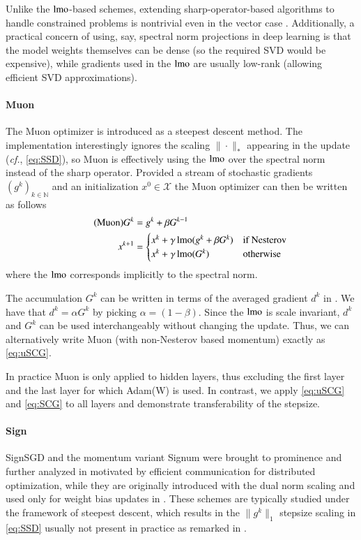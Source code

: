 Unlike the $\operatorname{lmo}$-based schemes, extending sharp-operator-based algorithms to handle constrained problems is nontrivial even in the vector case \citep{el2018learning}. 
Additionally, a practical concern of using, say, spectral norm projections in deep learning is that the model weights themselves can be dense (so the required SVD would be expensive), while gradients used in the $\operatorname{lmo}$ are usually low-rank (allowing efficient SVD approximations).

\paragraph{Muon} The Muon optimizer \citep{jordan2024muon} is introduced as a steepest descent method. 
The implementation interestingly ignores the scaling $\|\cdot\|_*$ appearing in the update (\textit{cf.}, \eqref{eq:SSD}), so Muon is effectively using the $\operatorname{lmo}$ over the spectral norm instead of the sharp operator.
Provided a stream of stochastic gradients $(g^k)_{k\in \mathbb N}$ and an initialization $x^0\in\mathcal X$ the Muon optimizer can then be written as follows
\begin{align*}\label{eq:Muon}
\tag{Muon}
G^k &= g^k + \beta G^{k-1} \\
x^{k+1} &= \begin{cases}
x^{k} + \gamma \operatorname{lmo}(g^k + \beta G^k) & \text{if Nesterov} \\
x^{k} + \gamma \operatorname{lmo}(G^k) & \text{otherwise}
\end{cases}
\end{align*}
where the $\operatorname{lmo}$ corresponds implicitly to the spectral norm.

The accumulation $G^k$ can be written in terms of the averaged gradient $d^k$ in .
We have that $d^k = \alpha G^k$ by picking $\alpha = (1-\beta)$.
Since the $\operatorname{lmo}$ is scale invariant, $d^k$ and $G^k$ can be used interchangeably without changing the update.
Thus, we can alternatively write Muon (with non-Nesterov based momentum) exactly as \ref{eq:uSCG}.

In practice Muon is only applied to hidden layers, thus excluding the first layer and the last layer for which Adam(W) is used.
In contrast, we apply \ref{eq:uSCG} and \ref{eq:SCG} to all layers and demonstrate transferability of the stepsize.

\paragraph{Sign}
SignSGD and the momentum variant Signum were brought to prominence and further analyzed in \citet{bernstein2018signsgd} motivated by efficient communication for distributed optimization, while they are originally introduced with the dual norm scaling and used only for weight bias updates in \citet{carlson2015stochastic,carlson2015stochasticb,carlson2015preconditioned}.
These schemes are typically studied under the framework of steepest descent, which results in the $\|g^k\|_1$ stepsize scaling in \eqref{eq:SSD} usually not present in practice as remarked in \citet{balles2020geometry}.

